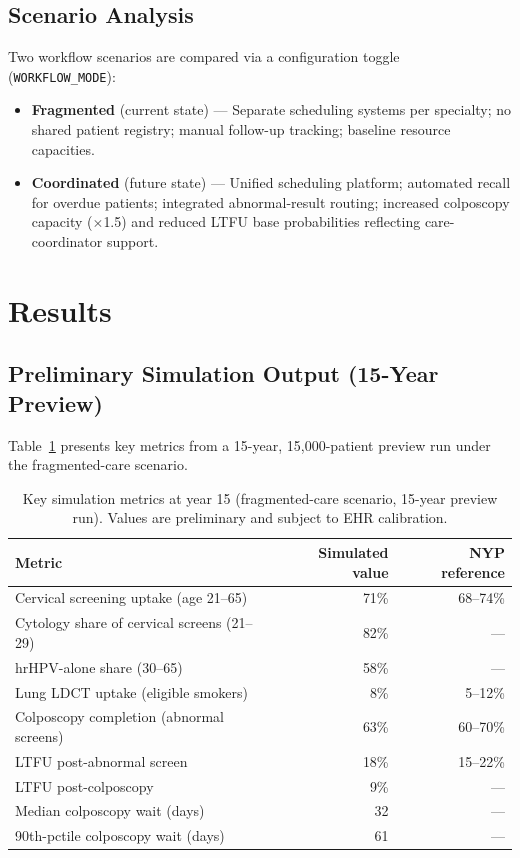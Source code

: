 \documentclass[12pt]{article}
\begin{document}
\subsection{Scenario Analysis}

Two workflow scenarios are compared via a configuration toggle
(\texttt{WORKFLOW\_MODE}):
\begin{itemize}[leftmargin=2em]
  \item \textbf{Fragmented} (current state) — Separate scheduling systems
        per specialty; no shared patient registry; manual follow-up
        tracking; baseline resource capacities.
  \item \textbf{Coordinated} (future state) — Unified scheduling platform;
        automated recall for overdue patients; integrated abnormal-result
        routing; increased colposcopy capacity ($\times$1.5) and reduced
        LTFU base probabilities reflecting care-coordinator support.
\end{itemize}

\section{Results}

\subsection{Preliminary Simulation Output (15-Year Preview)}

Table~\ref{tab:results} presents key metrics from a 15-year, 15{,}000-patient
preview run under the fragmented-care scenario.

\begin{table}[H]
  \centering
  \caption{Key simulation metrics at year 15 (fragmented-care scenario,
           15-year preview run). Values are preliminary and subject to
           EHR calibration.}
  \label{tab:results}
  \begin{tabular}{lrr}
    \toprule
    \textbf{Metric} & \textbf{Simulated value} & \textbf{NYP reference} \\
    \midrule
    Cervical screening uptake (age 21--65)   & 71\%  & 68--74\% \\
    Cytology share of cervical screens (21--29) & 82\%  & ---   \\
    hrHPV-alone share (30--65)              & 58\%  & ---      \\
    Lung LDCT uptake (eligible smokers)     & 8\%   & 5--12\%  \\
    Colposcopy completion (abnormal screens)& 63\%  & 60--70\% \\
    LTFU post-abnormal screen               & 18\%  & 15--22\% \\
    LTFU post-colposcopy                    & 9\%   & ---      \\
    Median colposcopy wait (days)           & 32    & ---      \\
    90th-pctile colposcopy wait (days)      & 61    & ---      \\
    \bottomrule
  \end{tabular}
\end{table}
\end{document}
